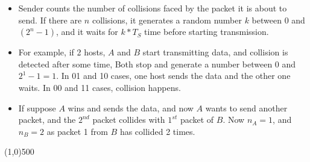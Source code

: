 \documentclass{article}
\begin{document}
\begin{itemize}
\begin{itemize}
\begin{itemize}
			\item Sender counts the number of collisions faced by the packet it is about to send. If there are $n$ collisions, it generates a random number $k$ between 0 and $(2^n-1)$, and it waits for $k*T_S$ time before starting transmission.
			\item For example, if 2 hosts, $A$ and $B$ start transmitting data, and collision is detected after some time, Both stop and generate a number between 0 and $2^1-1=1$. In 01 and 10 cases, one host sends the data and the other one waits. In 00 and 11 cases, collision happens.
			\item If suppose $A$ wins and sends the data, and now $A$ wants to send another packet, and the $2^{nd}$ packet collides with $1^{st}$ packet of $B$. Now $n_A=1$, and $n_B=2$ as packet 1 from $B$ has collided 2 times.
		\end{itemize}
	\end{itemize}
\end{itemize}
\begin{center}
	\line(1,0){500}
\end{center}
\end{document}
